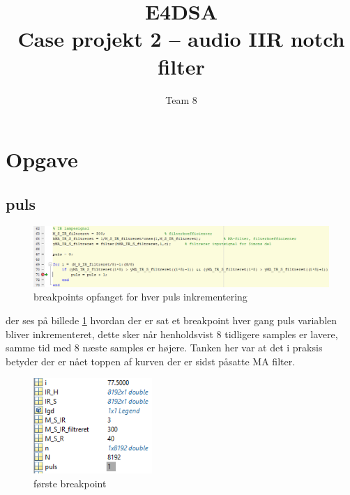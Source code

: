 \documentclass{article}
\title{E4DSA\\ Case projekt 2 – audio IIR notch filter}
\author{Team 8}
\begin{document}
\maketitle
\tableofcontents
\newpage

\section{Opgave}
\label{sec:opgave}

\subsection{puls}
\label{sec:puls}

\begin{figure}[h!]
  \centering
  \includegraphics[width=1.0\textwidth]{billeder/breakpoint.png}
  \caption{breakpoints opfanget for hver puls inkrementering}
  \label{fig:breakpoint}
\end{figure}

der ses på billede \ref{fig:breakpoint} hvordan der er sat et breakpoint hver gang puls variablen bliver inkrementeret, dette sker når henholdsvist 8 tidligere samples er lavere, samme tid med 8 næste samples er højere.
Tanken her var at det i praksis betyder der er nået toppen af kurven der er sidst påsatte MA filter.

\begin{figure}[h!]
  \centering
  \includegraphics[width=0.4\textwidth]{billeder/break1.png}
  \caption{første breakpoint}
  \label{fig:break1}
\end{figure}
\end{document}
